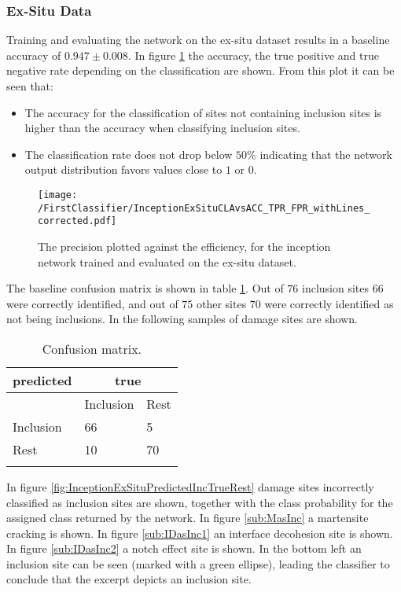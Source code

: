\subsubsection{Ex-Situ Data}
Training and evaluating the network on the ex-situ dataset results in a baseline accuracy of $0.947\pm 0.008$. In figure \ref{fig:InceptionExSituCLAvsACC} the accuracy, the true positive and true negative rate depending on the classification are shown. From this plot it can be seen that:
\begin{itemize}
\item The accuracy for the classification of sites not containing inclusion sites is higher than the accuracy when classifying inclusion sites. 
\item The classification rate does not drop below $50\%$ indicating that the network output distribution favors values close to $1$ or $0$.
\end{itemize}

\begin{figure}[H]
\texttt{[image: /FirstClassifier/InceptionExSituCLAvsACC\_TPR\_FPR\_withLines\_corrected.pdf]}
\caption{The precision plotted against the efficiency, for the inception network trained and evaluated on the ex-situ dataset.}
\label{fig:InceptionExSituCLAvsACC}
\end{figure}

The baseline confusion matrix is shown in table \ref{tab:FirstClassifierConfusionMatrixExSitu}. Out of $76$ inclusion sites $66$ were correctly identified, and out of $75$ other sites $70$ were correctly identified as not being inclusions. In the following samples of damage sites are shown.

\begin{table}
 \begin{center}
  \begin{tabular}{@{} *3l @{}} \toprule[2pt]
   predicted &  \multicolumn{2}{c}{true}  \\\midrule
    & Inclusion  & Rest   \\ 
   Inclusion  & 66 & 5 \\ 
   Rest  & 10 & 70 \\ \bottomrule[2pt]
   \label{tab:FirstClassifierConfusionMatrixExSitu}
  \end{tabular}
 \end{center}
 \caption{Confusion matrix.}
\end{table}

In figure \ref{fig:InceptionExSituPredictedIncTrueRest} damage sites incorrectly classified as inclusion sites are shown, together with the class probability for the assigned class returned by the network. In figure \ref{sub:MasInc} a martensite cracking is shown. In figure \ref{sub:IDasInc1} an interface decohesion site is shown. In figure \ref{sub:IDasInc2} a notch effect site is shown. In the bottom left an inclusion site can be seen (marked with a green ellipse), leading the classifier to conclude that the excerpt depicts an inclusion site. 

